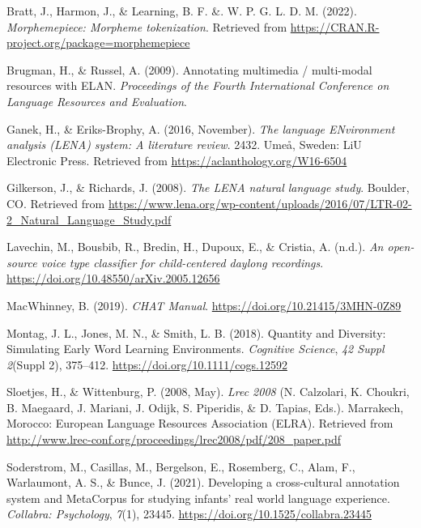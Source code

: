 \documentclass[
  man,floatsintext]{apa6}
\newlength{\cslhangindent}
\newenvironment{CSLReferences}[2] %
 {\begin{list}{}{%
  \setlength{\itemindent}{0pt}
  \setlength{\leftmargin}{0pt}
  \setlength{\parsep}{0pt}
  \ifodd #1
   \setlength{\leftmargin}{\cslhangindent}
   \setlength{\itemindent}{-1\cslhangindent}
  \fi
  \setlength{\itemsep}{#2\baselineskip}}}
 {\end{list}}
\begin{document}
\label{refs}
\begin{CSLReferences}{1}{0}
Bratt, J., Harmon, J., \& Learning, B. F. \&. W. P. G. L. D. M. (2022). \emph{Morphemepiece: Morpheme tokenization}. Retrieved from \url{https://CRAN.R-project.org/package=morphemepiece}

Brugman, H., \& Russel, A. (2009). Annotating multimedia / multi-modal resources with ELAN. \emph{Proceedings of the Fourth International Conference on Language Resources and Evaluation}.

Ganek, H., \& Eriks-Brophy, A. (2016, November). \emph{The language ENvironment analysis (LENA) system: A literature review}. 2432. Umeå, Sweden: LiU Electronic Press. Retrieved from \url{https://aclanthology.org/W16-6504}

Gilkerson, J., \& Richards, J. (2008). \emph{The LENA natural language study}. Boulder, CO. Retrieved from \url{https://www.lena.org/wp-content/uploads/2016/07/LTR-02-2_Natural_Language_Study.pdf}

Lavechin, M., Bousbib, R., Bredin, H., Dupoux, E., \& Cristia, A. (n.d.). \emph{An open-source voice type classifier for child-centered daylong recordings}. \url{https://doi.org/10.48550/arXiv.2005.12656}

MacWhinney, B. (2019). \emph{CHAT Manual}. \url{https://doi.org/10.21415/3MHN-0Z89}

Montag, J. L., Jones, M. N., \& Smith, L. B. (2018). Quantity and Diversity: Simulating Early Word Learning Environments. \emph{Cognitive Science}, \emph{42 Suppl 2}(Suppl 2), 375--412. \url{https://doi.org/10.1111/cogs.12592}

Sloetjes, H., \& Wittenburg, P. (2008, May). \emph{Lrec 2008} (N. Calzolari, K. Choukri, B. Maegaard, J. Mariani, J. Odijk, S. Piperidis, \& D. Tapias, Eds.). Marrakech, Morocco: European Language Resources Association (ELRA). Retrieved from \url{http://www.lrec-conf.org/proceedings/lrec2008/pdf/208_paper.pdf}

Soderstrom, M., Casillas, M., Bergelson, E., Rosemberg, C., Alam, F., Warlaumont, A. S., \& Bunce, J. (2021). Developing a cross-cultural annotation system and MetaCorpus for studying infants{'} real world language experience. \emph{Collabra: Psychology}, \emph{7}(1), 23445. \url{https://doi.org/10.1525/collabra.23445}


\end{CSLReferences}
\end{document}
